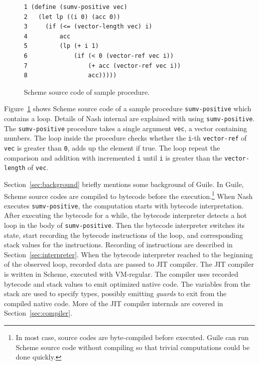 \documentclass[preprint, 10pt]{sigplanconf}
\begin{document}
\begin{figure}
  \begin{center}
    \small
\begin{verbatim}
1 (define (sumv-positive vec)
2   (let lp ((i 0) (acc 0))
3     (if (<= (vector-length vec) i)
4         acc
5         (lp (+ i 1)
6             (if (< 0 (vector-ref vec i))
7                 (+ acc (vector-ref vec i))
8                 acc)))))
\end{verbatim}
\end{center}
\caption{Scheme source code of sample procedure.}
\label{fig:scmloop}
\end{figure}

Figure~\hyperref[fig:scmloop]{\ref{fig:scmloop}} shows Scheme source code of a
sample procedure \texttt{sumv-positive} which contains a loop. Details of Nash
internal are explained with using \texttt{sumv-positive}. The
\texttt{sumv-positive} procedure takes a single argument \texttt{vec}, a vector
containing numbers. The loop inside the procedure checks whether the
\texttt{i}-th \texttt{vector-ref} of \texttt{vec} is greater than \texttt{0},
adds up the element if true. The loop repeat the comparison and addition with
incremented \texttt{i} until \texttt{i} is greater than the
\texttt{vector-length} of \texttt{vec}.

Section~\hyperref[sec:background]{\ref{sec:background}} briefly mentions some
background of Guile. In Guile, Scheme source codes are compiled to bytecode
before the execution.\footnote{In most case, source codes are byte-compiled
  before executed. Guile can run Scheme source code without compiling so that
  trivial computations could be done quickly.} When Nash executes
\texttt{sumv-positive}, the computation starts with bytecode
interpretation. After executing the bytecode for a while, the bytecode
interpreter detects a hot loop in the body of \texttt{sumv-positive}. Then the
bytecode interpreter switches its state, start recording the bytecode
instructions of the loop, and corresponding stack values for the
instructions. Recording of instructions are described in
Section~\hyperref[sec:interpreter]{\ref{sec:interpreter}}. When the bytecode
interpreter reached to the beginning of the observed loop, recorded data are
passed to JIT compiler. The JIT compiler is written in Scheme, executed with
VM-regular. The compiler uses recorded bytecode and stack values to emit
optimized native code. The variables from the stack are used to specify types,
possibly emitting \textit{guards} to exit from the compiled native code. More of
the JIT compiler internals are covered in
Section~\hyperref[sec:compiler]{\ref{sec:compiler}}.
\end{document}
